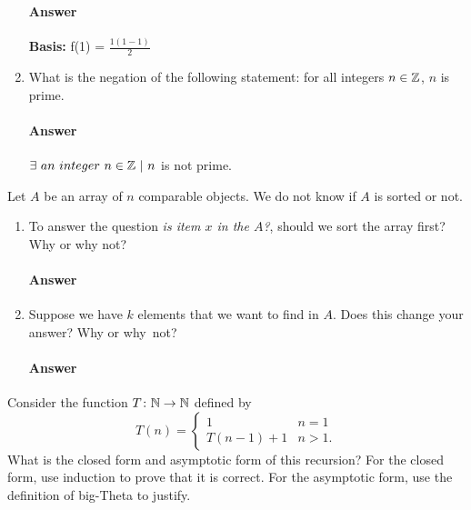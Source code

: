 \documentclass{article}
\begin{document}
\begin{enumerate}
            \paragraph{Answer}

            {\bf Basis:} f(1) = $\frac{1(1-1)}{2}$


            \todo{}

      \item What is the negation of the following statement: for all integers $n
                  \in {\mathbb Z}$, $n$ is prime.

            \paragraph{Answer}
            $\exists\ an\ integer\ n \in \Z\ |\ n$ is not prime.

\end{enumerate}


\collab{\todo{}}
Let $A$ be an array of $n$ comparable objects.  We do not know if $A$ is sorted
or not.

\begin{enumerate}
      \item To answer the question \emph{is item $x$ in the $A$?}, should we
            sort the array first?  Why or why not?

            \paragraph{Answer}
            \todo{}

      \item Suppose we have $k$ elements that we want to find in $A$. Does this
            change your answer? Why or why~not?

            \paragraph{Answer}
            \todo{}

\end{enumerate}

\collab{\todo{}}
Consider the function $T \colon {\mathbb N} \to {\mathbb N}$ defined by
$$T(n) = \begin{cases}
            1        & n=1  \\
            T(n-1)+1 & n>1.
      \end{cases}
$$
What is the closed form and asymptotic form of this recursion?  For the
closed form, use induction to prove that it is correct.  For the asymptotic
form, use the definition of big-Theta to justify.
\end{document}
